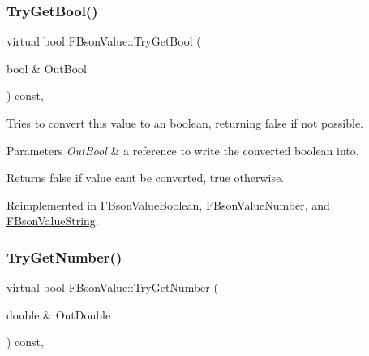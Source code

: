 \mbox{\label{class_f_bson_value_a1c7d6b561d3cc8a7db99b850740c642e}} 
\subsubsection{\texorpdfstring{Try\+Get\+Bool()}{TryGetBool()}}
{\footnotesize\ttfamily virtual bool F\+Bson\+Value\+::\+Try\+Get\+Bool (\begin{DoxyParamCaption}\item[{bool \&}]{Out\+Bool }\end{DoxyParamCaption}) const\hspace{0.3cm}{\ttfamily [inline]}, {\ttfamily [virtual]}}

Tries to convert this value to an boolean, returning false if not possible.


\begin{DoxyParams}{Parameters}
{\em Out\+Bool} & a reference to write the converted boolean into. \\
\hline
\end{DoxyParams}
\begin{DoxyReturn}{Returns}
false if value can\textquotesingle{}t be converted, true otherwise. 
\end{DoxyReturn}


Reimplemented in \mbox{\hyperlink{class_f_bson_value_boolean_a1999907437ed5dc5142f46919683c478}{F\+Bson\+Value\+Boolean}}, \mbox{\hyperlink{class_f_bson_value_number_af85e6c473afae0cb5340499ab013cf4f}{F\+Bson\+Value\+Number}}, and \mbox{\hyperlink{class_f_bson_value_string_a81c2e67998032708c613773746c962bd}{F\+Bson\+Value\+String}}.

\mbox{\label{class_f_bson_value_a519904f85122172ad9ca2f6b0b144f26}} 
\subsubsection{\texorpdfstring{Try\+Get\+Number()}{TryGetNumber()}\hspace{0.1cm}{\footnotesize\ttfamily [1/4]}}
{\footnotesize\ttfamily virtual bool F\+Bson\+Value\+::\+Try\+Get\+Number (\begin{DoxyParamCaption}\item[{double \&}]{Out\+Double }\end{DoxyParamCaption}) const\hspace{0.3cm}{\ttfamily [inline]}, {\ttfamily [virtual]}}

